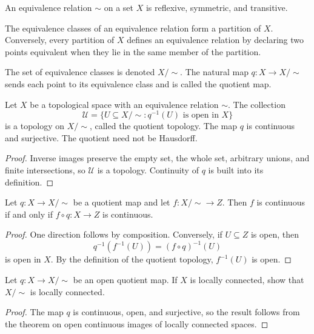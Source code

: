 \begin{de}
An equivalence relation $\sim$ on a set $X$ is reflexive, symmetric, and
transitive.
\end{de}

\begin{thm}
The equivalence classes of an equivalence relation form a partition of $X$.
Conversely, every partition of $X$ defines an equivalence relation by
declaring two points equivalent when they lie in the same member of the
partition.
\end{thm}

\begin{de}
The set of equivalence classes is denoted $X/\!\sim$. The natural map
$q:X\to X/\!\sim$ sends each point to its equivalence class and is called the
quotient map.
\end{de}

\begin{thm}
Let $X$ be a topological space with an equivalence relation $\sim$. The
collection
\[
\mathcal{U}=\{U\subseteq X/\!\sim:q^{-1}(U)\text{ is open in }X\}
\]
is a topology on $X/\!\sim$, called the quotient topology. The map $q$ is
continuous and surjective. The quotient need not be Hausdorff.
\end{thm}

\begin{proof}
Inverse images preserve the empty set, the whole set, arbitrary unions, and
finite intersections, so $\mathcal{U}$ is a topology. Continuity of $q$ is
built into its definition.
\end{proof}

\begin{thm}
Let $q:X\to X/\!\sim$ be a quotient map and let $f:X/\!\sim\to Z$. Then $f$
is continuous if and only if $f\circ q:X\to Z$ is continuous.
\end{thm}

\begin{proof}
One direction follows by composition. Conversely, if $U\subseteq Z$ is open,
then
\[
q^{-1}(f^{-1}(U))=(f\circ q)^{-1}(U)
\]
is open in $X$. By the definition of the quotient topology,
$f^{-1}(U)$ is open.
\end{proof}

\begin{ex}
Let $q:X\to X/\!\sim$ be an open quotient map. If $X$ is locally connected,
show that $X/\!\sim$ is locally connected.
\end{ex}

\begin{proof}
The map $q$ is continuous, open, and surjective, so the result follows from
the theorem on open continuous images of locally connected spaces.
\end{proof}

